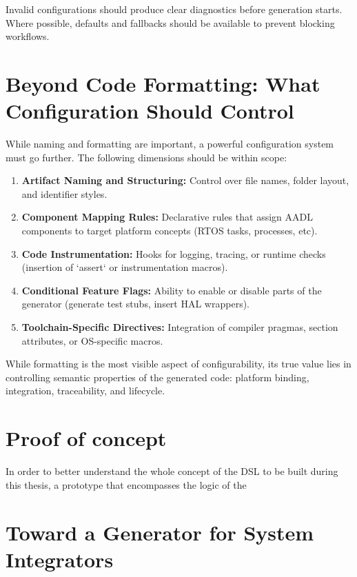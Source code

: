 Invalid configurations should produce clear diagnostics before generation starts. Where possible, defaults and fallbacks should be available to prevent blocking workflows.

\section{Beyond Code Formatting: What Configuration Should Control}
\label{sec:config_scope}

While naming and formatting are important, a powerful configuration system must go further. The following dimensions should be within scope:

\begin{enumerate}
	\item \textbf{Artifact Naming and Structuring:} Control over file names, folder layout, and identifier styles.
	\item \textbf{Component Mapping Rules:} Declarative rules that assign AADL components to target platform concepts (RTOS tasks, processes, etc).
	\item \textbf{Code Instrumentation:} Hooks for logging, tracing, or runtime checks (insertion of `assert` or instrumentation macros).
	\item \textbf{Conditional Feature Flags:} Ability to enable or disable parts of the generator (generate test stubs, insert HAL wrappers).
	\item \textbf{Toolchain-Specific Directives:} Integration of compiler pragmas, section attributes, or OS-specific macros.
\end{enumerate}

\begin{tcolorbox}[colback=blue!5, colframe=blue!50!black, title=Configuration is More Than Style]
	While formatting is the most visible aspect of configurability, its true value lies in controlling semantic properties of the generated code: platform binding, integration, traceability, and lifecycle.
\end{tcolorbox}

\section{Proof of concept}
\label{sec:proof_of_concept}

In order to better understand the whole concept of the DSL to be built during this thesis, a prototype that encompasses the logic of the 


\section{Toward a Generator for System Integrators}
\label{sec:conclusion_configurable_generation}

